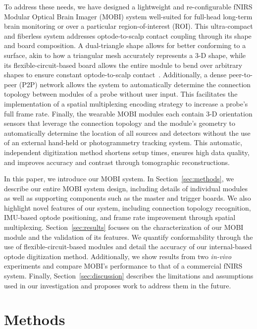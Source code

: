 To address these needs, we have designed a lightweight and re-configurable fNIRS Modular Optical Brain Imager (MOBI) system well-suited for full-head long-term brain monitoring or over a particular region-of-interest (ROI). This ultra-compact and fiberless system addresses optode-to-scalp contact coupling through its shape and board composition. A dual-triangle shape allows for better conforming to a surface, akin to how a triangular mesh accurately represents a 3-D shape, while its flexible-circuit-based board allows the entire module to bend over arbitrary shapes to ensure constant optode-to-scalp contact~\cite{Bartkowski2019, Muehlemann2008}. Additionally, a dense peer-to-peer (P2P) network allows the system to automatically determine the connection topology between modules of a probe without user input. This facilitates the implementation of a spatial multiplexing encoding strategy to increase a probe's full frame rate. Finally, the wearable MOBI modules each contain 3-D orientation sensors that leverage the connection topology and the module's geometry to automatically determine the location of all sources and detectors without the use of an external hand-held or photogrammetry tracking system. This automatic, independent digitization method shortens setup times, ensures high data quality, and improves accuracy and contrast through tomographic reconstructions.

In this paper, we introduce our MOBI system. In Section~\ref{sec:methods}, we describe our entire MOBI system design, including details of individual modules as well as supporting components such as the master and trigger boards. We also highlight novel features of our system, including connection topology recognition, IMU-based optode positioning, and frame rate improvement through spatial multiplexing. Section~\ref{sec:results} focuses on the characterization of our MOBI module and the validation of its features. We quantify conformability through the use of flexible-circuit-based modules and detail the accuracy of our internal-based optode digitization method. Additionally, we show results from two \emph{in-vivo} experiments and compare MOBI's performance to that of a commercial fNIRS system. Finally, Section~\ref{sec:discussion} describes the limitations and assumptions used in our investigation and proposes work to address them in the future.  




\section{Methods}
\label{chap:mobi:methods}


